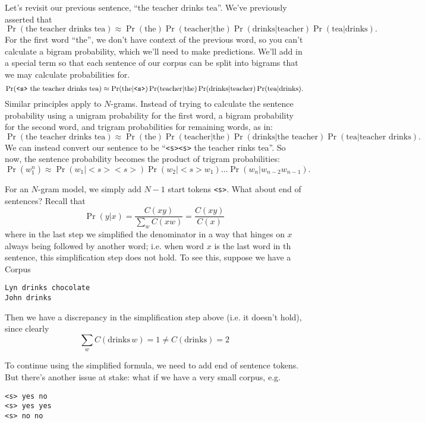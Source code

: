 \documentclass[12pt]{article}
\begin{document}
Let's revisit our previous sentence, ``the teacher drinks tea''. We've previously asserted that
\[
\Pr(\textrm{the teacher drinks tea} ) \approx \Pr(\textrm{the}) \Pr(\textrm{teacher} | \textrm{the}) \Pr(\textrm{drinks} | \textrm{teacher}) \Pr(\textrm{tea} | \textrm{drinks}).
\]
For the first word ``the'', we don't have context of the previous word, so you can't calculate a bigram probability, which we'll need to make predictions. We'll add in a special term so that each sentence of our corpus can be split into bigrams that we may calculate probabilities for.
\[
\Pr(\textrm{\texttt{<s>} the teacher drinks tea} ) \approx \Pr(\textrm{the} | \texttt{<s>}) \Pr(\textrm{teacher} | \textrm{the}) \Pr(\textrm{drinks} | \textrm{teacher}) \Pr(\textrm{tea} | \textrm{drinks}).
\]
Similar principles apply to $N$-grams. Instead of trying to calculate the sentence probability using a unigram probability for the first word, a bigram probability for the second word, and trigram probabilities for remaining words, as in:
\[
\Pr(\textrm{the teacher drinks tea} ) \approx \Pr(\textrm{the}) \Pr(\textrm{teacher} | \textrm{the}) \Pr(\textrm{drinks} | \textrm{the teacher}) \Pr(\textrm{tea} | \textrm{teacher drinks}).  
\]
We can instead convert our sentence to be ``\texttt{<s><s>} the teacher rinks tea''. So now, the sentence probability becomes the product of trigram probabilities:
\[
  \Pr(w_1^n) \approx \Pr(w_1 | <s> <s>) \Pr(w_2 | <s> w_1) \ldots \Pr(w_n | w_{n-2} w_{n-1}).
\]

For an $N$-gram model, we simply add $N-1$ start tokens \texttt{<s>}. What about end of sentences? Recall that
\[
  \Pr(y|x) = \frac{C(x y)}{\sum_w C(x w)} = \frac{C(x y)}{C(x)}
\]
where in the last step we simplified the denominator in a way that hinges on $x$ always being followed by another word; i.e. when word $x$ is the last word in th sentence, this simplification step does not hold. To see this, suppose we have a Corpus
\begin{verbatim}
Lyn drinks chocolate
John drinks
\end{verbatim}
Then we have a discrepancy in the simplification step above (i.e. it doesn't hold), since clearly
\[
  \sum_w C(\textrm{drinks}\, w) = 1 \neq C(\textrm{drinks}) = 2
\]

To continue using the simplified formula, we need to add end of sentence tokens. But there's another issue at stake: what if we have a very small corpus, e.g.
\begin{verbatim}
<s> yes no
<s> yes yes
<s> no no
\end{verbatim}
\end{document}
